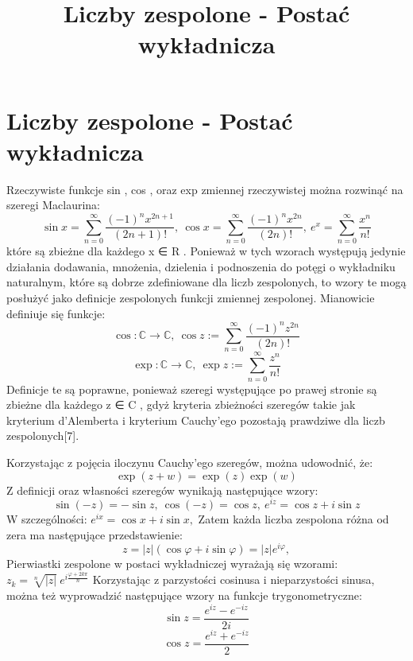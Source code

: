 \documentclass{article}
\begin{document}
\title{Liczby zespolone - Postać wykładnicza}
\maketitle

\section{Liczby zespolone - Postać wykładnicza}
Rzeczywiste funkcje sin , cos , oraz exp zmiennej rzeczywistej można rozwinąć na szeregi Maclaurina: 
$${ \sin x=\sum _{n=0}^{\infty }{\frac {(-1)^{n}x^{2n+1}}{(2n+1)!}},\ \cos x=\sum _{n=0}^{\infty }{\frac {(-1)^{n}x^{2n}}{(2n)!}},\ e^{x}=\sum _{n=0}^{\infty }{\frac {x^{n}}{n!}}}$$
które są zbieżne dla każdego x ∈ R . Ponieważ w tych wzorach występują jedynie działania dodawania, mnożenia, dzielenia i podnoszenia do potęgi o wykładniku naturalnym, które są dobrze zdefiniowane dla liczb zespolonych, to wzory te mogą posłużyć jako definicje zespolonych funkcji zmiennej zespolonej. Mianowicie definiuje się funkcje: 
$${ \cos :\mathbb {C} \to \mathbb {C} ,\ \cos z:=\sum _{n=0}^{\infty }{\frac {(-1)^{n}z^{2n}}{(2n)!}}}$$
$${ \exp :\mathbb {C} \to \mathbb {C} ,\ \exp z:=\sum _{n=0}^{\infty }{\frac {z^{n}}{n!}}}$$
Definicje te są poprawne, ponieważ szeregi występujące po prawej stronie są zbieżne dla każdego z ∈ C , gdyż kryteria zbieżności szeregów takie jak kryterium d’Alemberta i kryterium Cauchy’ego pozostają prawdziwe dla liczb zespolonych[7].

Korzystając z pojęcia iloczynu Cauchy’ego szeregów, można udowodnić, że: 
$${ \exp(z+w)=\exp(z)\exp(w)}$$
Z definicji oraz własności szeregów wynikają następujące wzory: 
$${ \sin(-z)=-\sin z,\ \cos(-z)=\cos z,\ e^{iz}=\cos z+i\sin z}$$
W szczególności: ${ e^{ix}=\cos x+i\sin x,}$
Zatem każda liczba zespolona różna od zera ma następujące przedstawienie: 
$${ z=|z|(\cos \varphi +i\sin \varphi )=|z|e^{i\varphi },}$$
Pierwiastki zespolone w postaci wykładniczej wyrażają się wzorami: 
$z_{k}={\sqrt[ {n}]{|z|}}\ e^{{i{\tfrac  {\varphi +2k\pi }{n}}}}$
Korzystając z parzystości cosinusa i nieparzystości sinusa, można też wyprowadzić następujące wzory na funkcje trygonometryczne: 
$${ \sin z={\frac {e^{iz}-e^{-iz}}{2i}}}$$
$${ \cos z={\frac {e^{iz}+e^{-iz}}{2}}}$$
\end{document}
